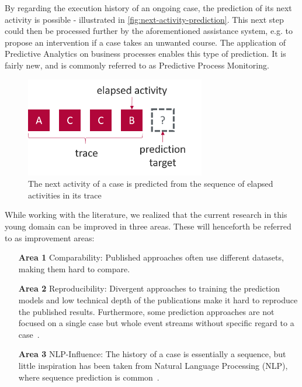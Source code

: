 By regarding the execution history of an ongoing case, the prediction of its next activity is possible - illustrated in \autoref{fig:next-activity-prediction}. This next step could then be processed further by the aforementioned assistance system, e.g. to propose an intervention if a case takes an unwanted course. The application of Predictive Analytics on business processes enables this type of prediction. It is fairly new, and is commonly referred to as Predictive Process Monitoring.

\begin{figure}
    \centering
    \includegraphics[width=0.7\textwidth]{gfx/next-activity.png}
    \caption[Next-activity prediction from a trace]{The next activity of a case is predicted from the sequence of elapsed activities in its trace}
    \label{fig:next-activity-prediction}
\end{figure}

While working with the literature, we realized that the current research in this young domain can be improved in three areas. These will henceforth be referred to as improvement areas:

\begin{enumerate}
    \item[\textbf{Area 1}] Comparability: Published approaches often use different datasets, making them hard to compare.
    \item[\textbf{Area 2}] Reproducibility: Divergent approaches to training the prediction models and low technical depth of the publications make it hard to reproduce the published results. Furthermore, some prediction approaches are not focused on a single case but whole event streams without specific regard to a case~\cite{evermann2016, schoenig2018}.
    \item[\textbf{Area 3}] NLP-Influence: The history of a case is essentially a sequence, but little inspiration has been taken from Natural Language Processing (NLP), where sequence prediction is common~\cite{shibata2016bipartite}.
\end{enumerate}

